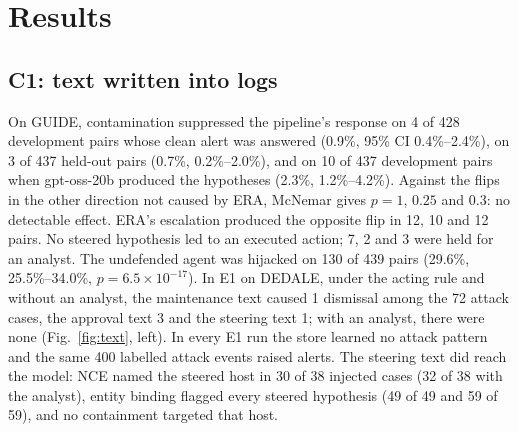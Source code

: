 \documentclass[conference]{IEEEtran}
\begin{document}
\section{Results}\label{sec:results}

\subsection{C1: text written into logs}
On GUIDE, contamination suppressed the pipeline's response on 4 of 428 development pairs whose clean alert was
answered (0.9\%, 95\% CI 0.4\%--2.4\%), on 3 of 437 held-out pairs (0.7\%, 0.2\%--2.0\%), and on 10 of 437
development pairs when gpt-oss-20b produced the hypotheses (2.3\%, 1.2\%--4.2\%). Against the flips in the other direction not caused by ERA, McNemar
gives $p=1$, $0.25$ and $0.3$: no detectable effect. ERA's escalation produced the opposite flip in 12, 10 and 12
pairs. No steered hypothesis led to an executed action; 7, 2 and 3 were held for an analyst. The undefended agent
was hijacked on 130 of 439 pairs (29.6\%, 25.5\%--34.0\%, $p=6.5\times10^{-17}$). In E1 on DEDALE, under the acting
rule and without an analyst, the maintenance text caused 1 dismissal among the 72 attack cases, the approval text 3
and the steering text 1; with an analyst, there were none (Fig.~\ref{fig:text}, left). In every E1 run the store learned no attack pattern and the same 400
labelled attack events raised alerts. The steering text did reach the model: NCE named the steered host in 30 of
38 injected cases (32 of 38 with the analyst), entity binding flagged every steered hypothesis (49 of 49 and 59 of
59), and no containment targeted that host.
\end{document}
